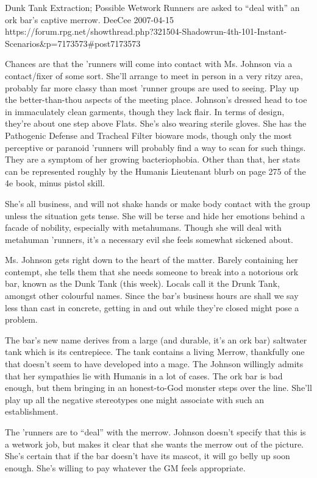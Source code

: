 \begin{scenario}{Dunk Tank}
	{Extraction; Possible Wetwork}
	{Runners are asked to ``deal with'' an ork bar's captive merrow.}
	{DeeCee}
	{2007-04-15}
	{https://forum.rpg.net/showthread.php?321504-Shadowrun-4th-101-Instant-Scenarios\&p=7173573\#post7173573}

  Chances are that the 'runners will come into contact with Ms. Johnson via a contact/fixer of some sort. She'll arrange to meet in person in a very ritzy area, probably far more classy than most 'runner groups are used to seeing. Play up the better-than-thou aspects of the meeting place. Johnson's dressed head to toe in immaculately clean garments, though they lack flair. In terms of design, they're about one step above Flats. She's also wearing sterile gloves. She has the Pathogenic Defense and Tracheal Filter bioware mods, though only the most perceptive or paranoid 'runners will probably find a way to scan for such things. They are a symptom of her growing bacteriophobia. Other than that, her stats can be represented roughly by the Humanis Lieutenant blurb on page 275 of the 4e book, minus pistol skill.

She's all business, and will not shake hands or make body contact with the group unless the situation gets tense. She will be terse and hide her emotions behind a facade of nobility, especially with metahumans. Though she will deal with metahuman 'runners, it's a necessary evil she feels somewhat sickened about.

\synopsis  Ms. Johnson gets right down to the heart of the matter. Barely containing her contempt, she tells them that she needs someone to break into a notorious ork bar, known as the Dunk Tank (this week). Locals call it the Drunk Tank, amongst other colourful names. Since the bar's business hours are shall we say less than cast in concrete, getting in and out while they're closed might pose a problem.

The bar's new name derives from a large (and durable, it's an ork bar) saltwater tank which is its centrepiece. The tank contains a living Merrow, thankfully one that doesn't seem to have developed into a mage. The Johnson willingly admits that her sympathies lie with Humanis in a lot of cases. The ork bar is bad enough, but them bringing in an honest-to-God monster steps over the line. She'll play up all the negative stereotypes one might associate with such an establishment.

The 'runners are to ``deal'' with the merrow. Johnson doesn't specify that this is a wetwork job, but makes it clear that she wants the merrow out of the picture. She's certain that if the bar doesn't have its mascot, it will go belly up soon enough. She's willing to pay whatever the GM feels appropriate.


\end{scenario}
